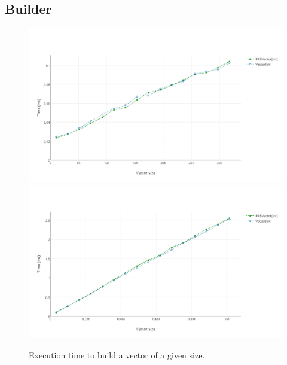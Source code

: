 \subsection{Builder}

\begin{figure}[h!]
  \centering
  \includegraphics[width=\textwidth]{Benchmarks/Builder_3.pdf}
  \includegraphics[width=\textwidth]{Benchmarks/Builder_4.pdf}
  \label{BuilderBenchmarks}
  \caption{Execution time to build a vector of a given size.}
\end{figure}

